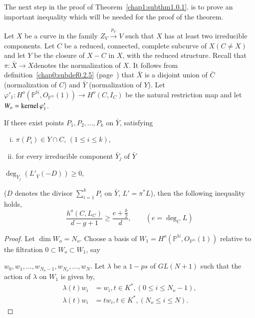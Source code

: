{The next step in the proof of Theorem~\ref{chap1:subthm1.0.1}. 
is to prove an important inequality which will be needed for 
the proof of the theorem. 

\begin{subprop}\label{chap1:subprop1.0.7}%
Let $X$ be a curve in the family $Z_V \xrightarrow{p_V} V$ such that
$X$ has at least two irreducible components. Let $C$ be a reduced,
connected, complete subcurve of $X(C \neq X)$ and let $Y$ be the
closure of $X-C$ in $X$, with the reduced structure. Recall that $\pi
: \bar{X} \to X$\pageoriginale denotes the normalization of $X$. It follows from
definition~\ref{chap0:subdef0.2.5} (page~\pageref{chap0:subdef0.2.5})
that $\bar{X}$ is a  disjoint union of 
$\bar{C}$ (normalization of $C$) and $\bar{Y}$ (normalization of
$Y$). Let $\varphi'_{1} : H^o (\mathbb{P^{N}}, O_{\mathbb{P^{N}}}(1))
\to H^o (C, I_C)$ be the natural restriction map and let $W_o =
\operatorname{kernel} \varphi'_{1}$. 
\end{subprop}

\noindent
If there exist points $P_1, P_2,\ldots, P_k$ on $\bar{Y}$, satisfying
\begin{enumerate}[i)]
\item $\pi (P_i) \in Y \cap C$, $(1 \leq i \leq k)$,

\item for every irreducible component $\bar{Y}_j$ of $\bar{Y}$\label{c1:cond2}
\end{enumerate}

$\deg_{\bar{Y}_j} (L'_{\bar{Y}}(-D)) \geq 0$,

($D$ denotes the divisor $\sum\limits^{k}_{i = 1} P_i$ on $\bar{Y}$, $L'
= \pi^{*} L$), then the following inequality holds, 
\begin{equation*}
\frac{h^o (C, L_C)}{d-g+1} \ge \frac{e+ \frac{k}{2}}{d}, \qquad (e=
\deg_C L) \tag{$*'$} 
\end{equation*}

\begin{proof}
Let $\dim W_o = N_o$. Choose a basis of $W_1 = H^o (\mathbb{P^N},
O_{\mathbb{P^N}}(1))$ relative to the filtration $0 \subset W_o
\subset W_1$, say 

\noindent
 $w_0,w_1, \ldots ,w_{N_o-1}, w_{N_o}, \ldots, w_N$. Let $\lambda$ be a
$1-ps$ of $GL(N+1)$ such that the action of $\lambda$ on $W_1$ is
given by,
\begin{align*}
\lambda (t) w_i & = w_i, t \in K^*, (0 \le i \le N_o -1),\\
\lambda (t) w_i & = tw_i, t \in K^*, (N_o \le i \le N).
\end{align*}


\end{proof}}
